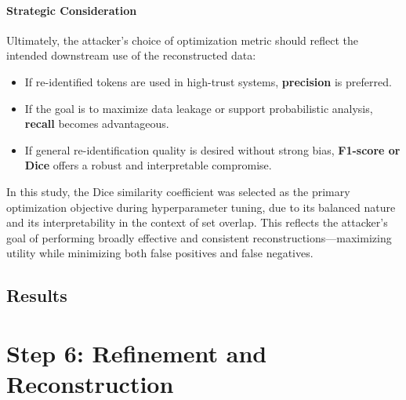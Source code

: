 \paragraph{Strategic Consideration}

Ultimately, the attacker’s choice of optimization metric should reflect the intended downstream use of the reconstructed data:

\begin{itemize}
    \item If re-identified tokens are used in high-trust systems, \textbf{precision} is preferred.
    \item If the goal is to maximize data leakage or support probabilistic analysis, \textbf{recall} becomes advantageous.
    \item If general re-identification quality is desired without strong bias, \textbf{F1-score or Dice} offers a robust and interpretable compromise.
\end{itemize}

In this study, the Dice similarity coefficient was selected as the primary optimization objective during hyperparameter tuning, due to its balanced nature and its interpretability in the context of set overlap.
This reflects the attacker’s goal of performing broadly effective and consistent reconstructions—maximizing utility while minimizing both false positives and false negatives.


\subsection{Results}



\section{Step 6: Refinement and Reconstruction} \label{sec:refinementandreconstruction}

